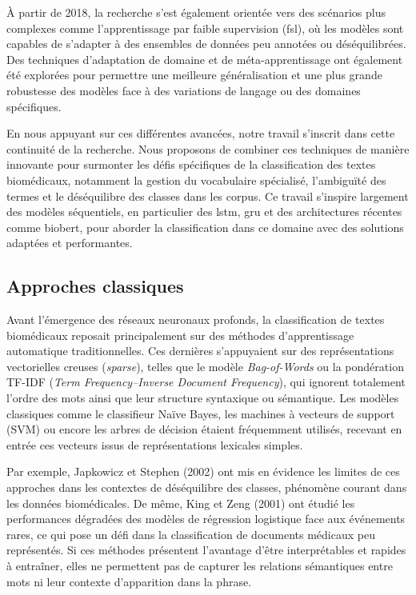 \documentclass[12pt]{report}
\begin{document}
À partir de 2018, la recherche s’est également orientée vers des scénarios plus complexes comme l’apprentissage par faible supervision (\gls{fsl}), où les modèles sont capables de s'adapter à des ensembles de données peu annotées ou déséquilibrées. Des techniques d'adaptation de domaine et de méta-apprentissage ont également été explorées pour permettre une meilleure généralisation et une plus grande robustesse des modèles face à des variations de langage ou des domaines spécifiques.

En nous appuyant sur ces différentes avancées, notre travail s'inscrit dans cette continuité de la recherche. Nous proposons de combiner ces techniques de manière innovante pour surmonter les défis spécifiques de la classification des textes biomédicaux, notamment la gestion du vocabulaire spécialisé, l'ambiguïté des termes et le déséquilibre des classes dans les corpus. Ce travail s’inspire largement des modèles séquentiels, en particulier des \gls{lstm}, \gls{gru} et des architectures récentes comme \gls{biobert}, pour aborder la classification dans ce domaine avec des solutions adaptées et performantes.

\subsection{Approches classiques}

Avant l’émergence des réseaux neuronaux profonds, la classification de textes biomédicaux reposait principalement sur des méthodes d’apprentissage automatique traditionnelles. Ces dernières s’appuyaient sur des représentations vectorielles creuses (\textit{sparse}), telles que le modèle \textit{Bag-of-Words} ou la pondération TF-IDF (\textit{Term Frequency–Inverse Document Frequency}), qui ignorent totalement l’ordre des mots ainsi que leur structure syntaxique ou sémantique. Les modèles classiques comme le classifieur Naïve Bayes, les machines à vecteurs de support (SVM) ou encore les arbres de décision étaient fréquemment utilisés, recevant en entrée ces vecteurs issus de représentations lexicales simples.

Par exemple, Japkowicz et Stephen (2002) \cite{japkowicz2002class} ont mis en évidence les limites de ces approches dans les contextes de déséquilibre des classes, phénomène courant dans les données biomédicales. De même, King et Zeng (2001) \cite{King2001Logit} ont étudié les performances dégradées des modèles de régression logistique face aux événements rares, ce qui pose un défi dans la classification de documents médicaux peu représentés. Si ces méthodes présentent l’avantage d’être interprétables et rapides à entraîner, elles ne permettent pas de capturer les relations sémantiques entre mots ni leur contexte d’apparition dans la phrase.
\end{document}
